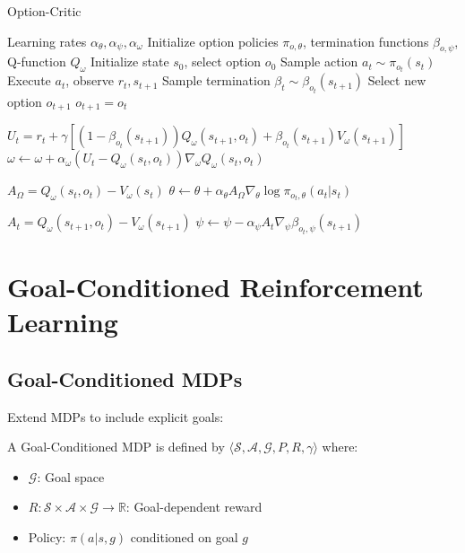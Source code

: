 \begin{algorithm}
\caption{Option-Critic}
\begin{algorithmic}
\REQUIRE Learning rates $\alpha_\theta, \alpha_\psi, \alpha_\omega$
\STATE Initialize option policies $\pi_{o,\theta}$, termination functions $\beta_{o,\psi}$, Q-function $Q_\omega$
    \STATE Initialize state $s_0$, select option $o_0$
        \STATE Sample action $a_t \sim \pi_{o_t}(s_t)$
        \STATE Execute $a_t$, observe $r_t, s_{t+1}$
        \STATE Sample termination $\beta_t \sim \beta_{o_t}(s_{t+1})$
            \STATE Select new option $o_{t+1}$
        \ELSE
            \STATE $o_{t+1} = o_t$
        \ENDIF
        
        \STATE {}
        \STATE $U_t = r_t + \gamma [(1-\beta_{o_t}(s_{t+1})) Q_\omega(s_{t+1}, o_t) + \beta_{o_t}(s_{t+1}) V_\omega(s_{t+1})]$
        \STATE $\omega \leftarrow \omega + \alpha_\omega (U_t - Q_\omega(s_t, o_t)) \nabla_\omega Q_\omega(s_t, o_t)$
        
        \STATE {}
        \STATE $A_\Omega = Q_\omega(s_t, o_t) - V_\omega(s_t)$
        \STATE $\theta \leftarrow \theta + \alpha_\theta A_\Omega \nabla_\theta \log \pi_{o_t,\theta}(a_t|s_t)$
        
        \STATE {}
        \STATE $A_t = Q_\omega(s_{t+1}, o_t) - V_\omega(s_{t+1})$
        \STATE $\psi \leftarrow \psi - \alpha_\psi A_t \nabla_\psi \beta_{o_t,\psi}(s_{t+1})$
    \ENDFOR
\ENDFOR
\end{algorithmic}
\end{algorithm}

\section{Goal-Conditioned Reinforcement Learning}

\subsection{Goal-Conditioned MDPs}

Extend MDPs to include explicit goals:

\begin{definition}
A Goal-Conditioned MDP is defined by $\langle \mathcal{S}, \mathcal{A}, \mathcal{G}, P, R, \gamma \rangle$ where:
\begin{itemize}
    \item $\mathcal{G}$: Goal space
    \item $R: \mathcal{S} \times \mathcal{A} \times \mathcal{G} \to \mathbb{R}$: Goal-dependent reward
    \item Policy: $\pi(a|s, g)$ conditioned on goal $g$
\end{itemize}
\end{definition}

